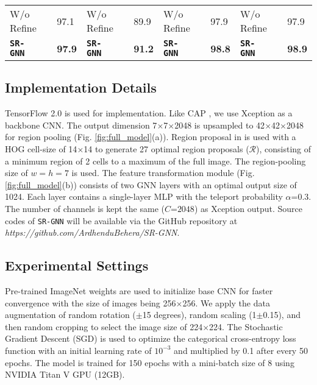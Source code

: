 \documentclass[journal]{IEEEtran}
\begin{document}
\begin{table*}[t]
\begin{small}
\begin{tabular}{|p{1.7 cm} p{8 mm} p{5 mm}|p{1.7 cm} p{8 mm} p{5 mm}|p{1.8 cm} p{8 mm} p{5 mm}|p{1.9 cm} p{13 mm} p{5 mm}|}
 W/o Refine &  &97.1 & W/o Refine &  &89.9 & W/o Refine &  & 97.9 & W/o Refine &  & 97.9 \\
\textbf{\texttt{SR-GNN}} &  & \textbf{97.9}  & \textbf{\texttt{SR-GNN}} &  & \textbf{91.2} & \textbf{\texttt{SR-GNN}} &  & \textbf{98.8} &\textbf{\texttt{SR-GNN}} & & \textbf{98.9} \\
    \hline  
  \end{tabular}
  \end{small}
\vspace{-0.5cm}
\end{table*}
\vspace{-0.3 cm}
\subsection {Implementation Details} TensorFlow 2.0 is used for implementation. Like CAP \cite{behera2021context}, we use Xception \cite{chollet2017xception} as a backbone CNN. The output dimension 7$\times$7$\times$2048 is upsampled to 42$\times$42$\times$2048
for region pooling (Fig. \ref{fig:full_model}(a)). Region proposal in \cite{behera2020regional} is used with a HOG cell-size of 14$\times$14 to generate 27 optimal region proposals ($\mathcal{R}$), consisting of a minimum region of 2 cells to a maximum of the full image. The region-pooling size of $w$$=$$h$$=$$7$ is used. The feature transformation module (Fig. \ref{fig:full_model}(b)) consists of two GNN layers with an optimal output size of 1024. Each layer contains a single-layer MLP with the teleport probability $\alpha$=$0.3$. The number of channels  is  kept the same ($C$=$2048$) as  Xception output. Source codes of \texttt{SR-GNN} will be available via the GitHub repository at \textit{https://github.com/ArdhenduBehera/SR-GNN}.

\vspace{ -0.2  cm}
\subsection {Experimental Settings}
Pre-trained ImageNet weights are used to initialize base CNN for faster convergence with the size of images being 256$\times$256. We apply the data augmentation of random rotation ($\pm$15 degrees), random scaling (1$\pm$0.15), and then random cropping to select the image size of 224$\times$224. The Stochastic Gradient Descent (SGD) is used to optimize the categorical cross-entropy loss function with an  initial learning rate of $10^{-3}$ and multiplied by 0.1 after every 50 epochs. The model is trained for 150 epochs with a mini-batch size of 8 using NVIDIA Titan V GPU (12GB). 
\end{document}
